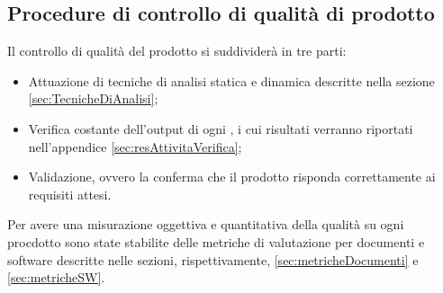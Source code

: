 \documentclass{scalatekids-article}
\begin{document}
\subsection{Procedure di controllo di qualità di prodotto}
Il controllo di qualità del prodotto si suddividerà in tre parti:
\begin{itemize}
\item{Attuazione di tecniche di analisi statica e dinamica descritte nella sezione \ref{sec:TecnicheDiAnalisi};}
\item{Verifica costante dell'output di ogni , i cui risultati verranno riportati nell'appendice \ref{sec:resAttivitaVerifica};}
\item{Validazione, ovvero la conferma che il prodotto risponda correttamente ai requisiti attesi.}
\end{itemize}
Per avere una misurazione oggettiva e quantitativa della qualità su ogni procdotto sono state stabilite delle metriche di valutazione per documenti e software descritte nelle sezioni, rispettivamente, \ref{sec:metricheDocumenti} e \ref{sec:metricheSW}.\\
\end{document}
